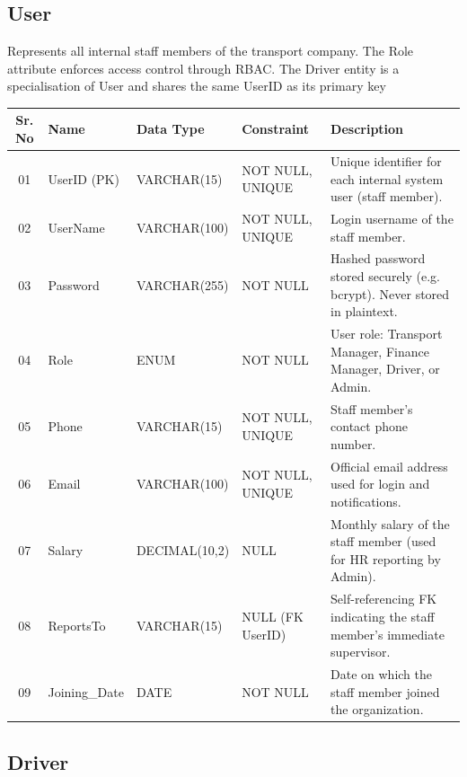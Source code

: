 \documentclass[12pt,a4paper]{report}
\begin{document}

\subsection{User}

Represents all internal staff members of the transport company. The Role attribute enforces access control through RBAC. The Driver entity is a specialisation of User and shares the same UserID as its primary key

\begin{longtable}{|c|p{3.5cm}|p{2.5cm}|p{3.5cm}|p{5cm}|}
\hline
\textbf{Sr. No} & \textbf{Name} & \textbf{Data Type} & \textbf{Constraint} & \textbf{Description} \\
\hline
01 & UserID (PK) & VARCHAR(15) & NOT NULL, UNIQUE & Unique identifier for each internal system user (staff member). \\
\hline
02 & UserName & VARCHAR(100) & NOT NULL, UNIQUE & Login username of the staff member. \\
\hline
03 & Password & VARCHAR(255) & NOT NULL & Hashed password stored securely (e.g. bcrypt). Never stored in plaintext. \\
\hline
04 & Role & ENUM & NOT NULL & User role: Transport Manager, Finance Manager, Driver, or Admin. \\
\hline
05 & Phone & VARCHAR(15) & NOT NULL, UNIQUE & Staff member's contact phone number. \\
\hline
06 & Email & VARCHAR(100) & NOT NULL, UNIQUE & Official email address used for login and notifications. \\
\hline
07 & Salary & DECIMAL(10,2) & NULL & Monthly salary of the staff member (used for HR reporting by Admin). \\
\hline
08 & ReportsTo & VARCHAR(15) & NULL (FK UserID) & Self-referencing FK indicating the staff member's immediate supervisor. \\
\hline
09 & Joining\_Date & DATE & NOT NULL & Date on which the staff member joined the organization. \\
\hline
\end{longtable}


\subsection{Driver}
\end{document}
